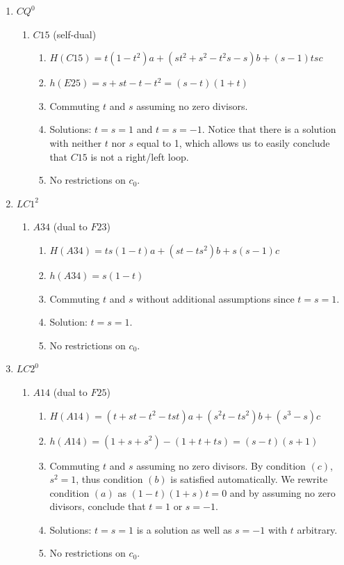 \documentclass[11pt]{amsart}
\theoremstyle{definition}
\begin{document}
\begin{enumerate}
 \item[(12)] $CQ^0$
        \begin{enumerate}
            \item $C15$ (self-dual)
            \begin{enumerate}
                \item $H(C15) = t(1-t^2)a+(st^2 + s^2 - t^2 s - s)b + (s-1)ts c$
                \item $h(E25) = s+st-t-t^2 = (s-t)(1+t)$ 
                \item Commuting $t$ and $s$ assuming no zero divisors. 
                \item Solutions: $t=s=1$ and $t=s=-1$. Notice that there is a solution with neither $t$ nor $s$ equal to 1, which allows us to easily conclude that $C15$ is not a right/left loop.
                \item No restrictions on $c_0$.
            \end{enumerate}
        \end{enumerate}

\item[(13)] $LC1^2$
        \begin{enumerate}
            \item $A34$ (dual to $F23$)
            \begin{enumerate}
                \item     $H(A34) = ts(1-t)a +(st-ts^2)b+s(s-1)c$
                \item $h(A34) = s(1-t)$
                \item Commuting $t$ and $s$ without additional assumptions since $t=s=1$.
                \item Solution: $t=s=1$.
                \item No restrictions on $c_0$.
            \end{enumerate}
        \end{enumerate}

\item[(14)] $LC2^0$
        \begin{enumerate}
            \item $A14$ (dual to $F25$)
            \begin{enumerate}
                \item  $H(A14)= (t+st-t^2-tst)a+ (s^2t-ts^2)b+ (s^3-s)c$
                \item $h(A14)=(1+s+s^2) - (1+t+ts)=(s-t)(s+1)$
                \item Commuting $t$ and $s$ assuming no zero divisors. By condition $(c)$, $s^2 = 1$, thus condition $(b)$ is satisfied automatically. We rewrite condition $(a)$ as $(1-t)(1+s)t = 0$ and by assuming no zero divisors, conclude that $t = 1$ or $s=-1$. 
                \item Solutions: $t=s=1$ is a solution as well as $s=-1$ with $t$ arbitrary. 
                \item No restrictions on $c_0$.
            \end{enumerate}
        \end{enumerate}


\end{enumerate}
\end{document}
